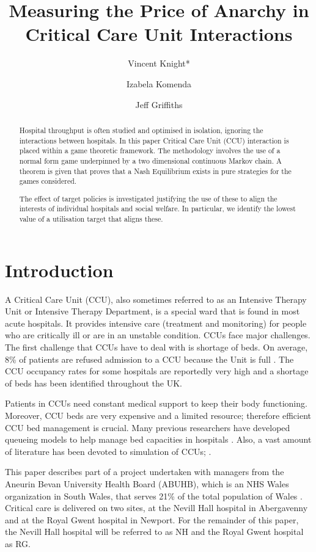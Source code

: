 \documentclass{article}
\title{Measuring the Price of Anarchy in Critical Care Unit Interactions}
\author{Vincent Knight*
    \and
        Izabela Komenda
    \and
        Jeff Griffiths}
\begin{document}
\maketitle

\begin{abstract}
Hospital throughput is often studied and optimised in isolation, ignoring the interactions between hospitals.
In this paper Critical Care Unit (CCU) interaction is placed within a game theoretic framework.
The methodology involves the use of a normal form game underpinned by a two dimensional continuous Markov chain.
A theorem is given that proves that a Nash Equilibrium exists in pure strategies for the games considered.

The effect of target policies is investigated justifying the use of these to align the interests of individual hospitals and social welfare.
In particular, we identify the lowest value of a utilisation target that aligns these.
\end{abstract}

\section{Introduction}

A Critical Care Unit (CCU), also sometimes referred to as an Intensive Therapy Unit or Intensive Therapy Department, is a special ward that is found in most acute hospitals.
It provides intensive care (treatment and monitoring) for people who are critically ill or are in an unstable condition.
CCUs face major challenges.
The first challenge that CCUs have to deal with is shortage of beds.  On average, 8\% of patients are refused admission to a CCU because the Unit is full \cite{Report}. The CCU occupancy rates for some hospitals are reportedly very high \cite{Mitchell1995,Smith1995} and a shortage of beds has been identified throughout the UK.

Patients in CCUs need constant medical support to keep their body functioning.
Moreover, CCU beds are very expensive and a limited resource; therefore efficient CCU bed management is crucial.
Many previous researchers have developed queueing models to help manage bed capacities in hospitals \cite{Cooper1974,Dumas1984,Gallivan2011,Gorunescu2002a,Griffiths2012,Harper2002a}.
Also, a vast amount of literature has been devoted to simulation of CCUs;  \cite{Cahill1999a,Costa2003,Griffiths2004a,Kim1999,Litvak2008,Shahani2008}.

This paper describes part of a project undertaken with managers from the Aneurin Bevan University Health Board (ABUHB), which is an NHS Wales organization in South Wales, that serves 21\% of the total population of Wales \cite{Board}.
Critical care is delivered on two sites, at the Nevill Hall hospital in Abergavenny and at the Royal Gwent hospital in Newport.
For the remainder of this paper, the Nevill Hall hospital will be referred to as NH and the Royal Gwent hospital as RG.
\end{document}
